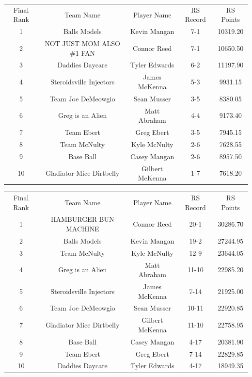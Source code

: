 \documentclass[11pt,letterpaper]{article}
\begin{document}
\newpage
{}
\vspace{-25pt}
\begin{table} [h]
\begin{center}
\begin{tabular} { c c c c c }
\\ Final Rank & Team Name & Player Name & RS Record & RS Points
\\ 1  & Balls Models & Kevin Mangan & 7-1 & 10319.20
\\ 2  & NOT JUST MOM ALSO \#1 FAN & Connor Reed & 7-1 & 10650.50
\\ 3  & Daddies Daycare & Tyler Edwards & 6-2 & 11197.90
\\ 4  & Steroidsville Injectors & James McKenna & 5-3 & 9931.15
\\ 5  & Team Joe DeMeowgio & Sean Musser & 3-5 & 8380.05
\\ 6  & Greg is an Alien & Matt Abraham & 4-4 & 9173.40
\\ 7  & Team Ebert & Greg Ebert & 3-5 & 7945.15
\\ 8  & Team McNulty & Kyle McNulty & 2-6 & 7628.55
\\ 9  & Base Ball & Casey Mangan & 2-6 & 8957.50
\\ 10  & Gladiator Mice Dirtbelly & Gilbert McKenna & 1-7 & 7618.20
\end{tabular}
\end{center}
\end{table}

\vspace{-25pt}
\begin{table} [h]
\begin{center}
\begin{tabular} { c c c c c }
\\ Final Rank & Team Name & Player Name & RS Record & RS Points
\\ 1  & HAMBURGER BUN MACHINE & Connor Reed & 20-1 & 30286.70
\\ 2  & Balls Models & Kevin Mangan & 19-2 & 27244.95
\\ 3  & Team McNulty & Kyle McNulty & 12-9 & 23644.05
\\ 4  & Greg is an Alien & Matt Abraham & 11-10 & 22985.20
\\ 5  & Steroidsville Injectors & James McKenna & 7-14 & 21925.00
\\ 6  & Team Joe DeMeowgio & Sean Musser & 10-11 & 22920.85
\\ 7  & Gladiator Mice Dirtbelly & Gilbert McKenna & 11-10 & 22758.95
\\ 8  & Base Ball & Casey Mangan & 4-17 & 20381.90
\\ 9  & Team Ebert & Greg Ebert & 7-14 & 22829.85
\\ 10  & Daddies Daycare & Tyler Edwards & 4-17 & 18949.35
\end{tabular}
\end{center}
\end{table}
\end{document}
